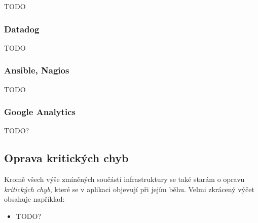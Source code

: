 TODO

\subsubsection{Datadog}

TODO

\subsubsection{Ansible, Nagios}

TODO

\subsubsection{Google Analytics}

TODO?

\subsection{Oprava kritických chyb}

Kromě všech výše zmíněných součástí infrastruktury se také starám o opravu \emph{kritických chyb}, které se v aplikaci objevují při jejím běhu. Velmi zkrácený výčet obsahuje například:
\begin{itemize}
	\item TODO?
\end{itemize}
